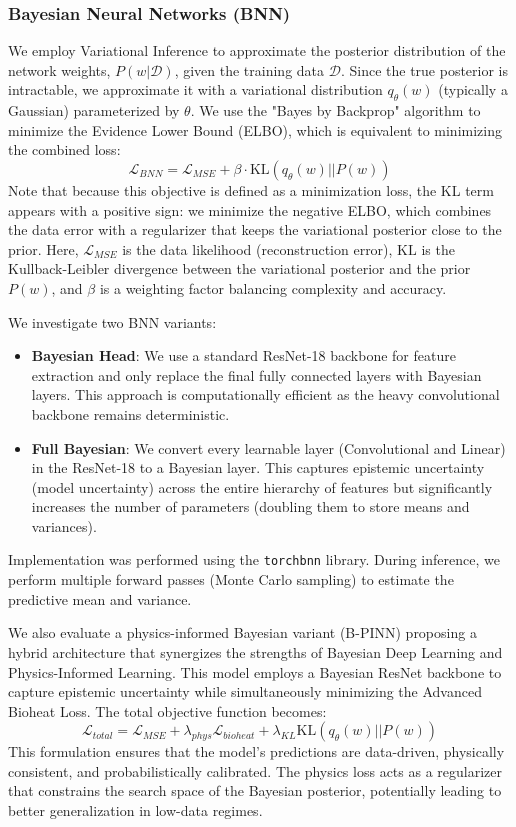 \subsubsection{Bayesian Neural Networks (BNN)}
We employ Variational Inference to approximate the posterior distribution of the network weights, $P(w|\mathcal{D})$, given the training data $\mathcal{D}$. Since the true posterior is intractable, we approximate it with a variational distribution $q_\theta(w)$ (typically a Gaussian) parameterized by $\theta$. We use the "Bayes by Backprop" algorithm \cite{blundell2015weight} to minimize the Evidence Lower Bound (ELBO), which is equivalent to minimizing the combined loss:
\begin{equation}
    \mathcal{L}_{BNN} = \mathcal{L}_{MSE} + \beta \cdot \text{KL}(q_\theta(w) || P(w))
\end{equation}
Note that because this objective is defined as a minimization loss, the KL term appears with a positive sign: we minimize the negative ELBO, which combines the data error with a regularizer that keeps the variational posterior close to the prior. Here, $\mathcal{L}_{MSE}$ is the data likelihood (reconstruction error), $\text{KL}$ is the Kullback-Leibler divergence between the variational posterior and the prior $P(w)$, and $\beta$ is a weighting factor balancing complexity and accuracy.

We investigate two BNN variants:
\begin{itemize}
    \item \textbf{Bayesian Head}: We use a standard ResNet-18 backbone for feature extraction and only replace the final fully connected layers with Bayesian layers. This approach is computationally efficient as the heavy convolutional backbone remains deterministic.
    \item \textbf{Full Bayesian}: We convert every learnable layer (Convolutional and Linear) in the ResNet-18 to a Bayesian layer. This captures epistemic uncertainty (model uncertainty) across the entire hierarchy of features but significantly increases the number of parameters (doubling them to store means and variances).
\end{itemize}
Implementation was performed using the \texttt{torchbnn} library. During inference, we perform multiple forward passes (Monte Carlo sampling) to estimate the predictive mean and variance.


We also evaluate a physics-informed Bayesian variant (B-PINN) proposing a hybrid architecture that synergizes the strengths of Bayesian Deep Learning and Physics-Informed Learning. 
This model employs a Bayesian ResNet backbone to capture epistemic uncertainty while simultaneously minimizing the Advanced Bioheat Loss. 
The total objective function becomes:
\begin{equation}
    \mathcal{L}_{total} = \mathcal{L}_{MSE} + \lambda_{phys} \mathcal{L}_{bioheat} + \lambda_{KL} \text{KL}(q_\theta(w) || P(w))
\end{equation}
This formulation ensures that the model's predictions are data-driven, physically consistent, and probabilistically calibrated. The physics loss acts as a regularizer that constrains the search space of the Bayesian posterior, potentially leading to better generalization in low-data regimes.
